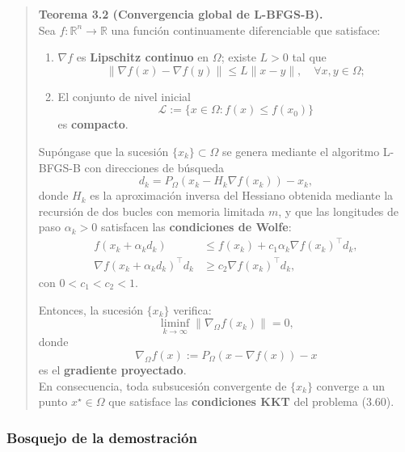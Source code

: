\documentclass[
  spanish,
  us-letterpaper,
  DIV=11,
  numbers=noendperiod]{scrreprt}
\providecommand{\tightlist}{%
  \setlength{\itemsep}{0pt}\setlength{\parskip}{0pt}}
\numberwithin{equation}{section}
\begin{document}
\begin{quote}
\textbf{Teorema 3.2 (Convergencia global de L-BFGS-B).}\\
Sea \(f : \mathbb{R}^n \to \mathbb{R}\) una función continuamente
diferenciable que satisface:

\begin{enumerate}
\def\labelenumi{\arabic{enumi}.}
\tightlist
\item
  \(\nabla f\) es \textbf{Lipschitz continuo} en \(\Omega\); existe
  \(L > 0\) tal que\\
  \[
  \|\nabla f(x) - \nabla f(y)\| \le L \|x - y\|, \quad \forall x, y \in \Omega; \tag{3.61}
  \]
\item
  El conjunto de nivel inicial\\
  \[
  \mathcal{L} := \{x \in \Omega : f(x) \le f(x_0)\} \tag{3.62}
  \] es \textbf{compacto}.
\end{enumerate}

Supóngase que la sucesión \(\{x_k\} \subset \Omega\) se genera mediante
el algoritmo L-BFGS-B con direcciones de búsqueda \[
d_k = P_\Omega(x_k - H_k \nabla f(x_k)) - x_k, \tag{3.63}
\] donde \(H_k\) es la aproximación inversa del Hessiano obtenida
mediante la recursión de dos bucles con memoria limitada \(m\), y que
las longitudes de paso \(\alpha_k > 0\) satisfacen las
\textbf{condiciones de Wolfe}: \[
\begin{aligned}
f(x_k + \alpha_k d_k) &\le f(x_k) + c_1 \alpha_k \nabla f(x_k)^\top d_k, \\
\nabla f(x_k + \alpha_k d_k)^\top d_k &\ge c_2 \nabla f(x_k)^\top d_k,
\end{aligned} \tag{3.64}
\] con \(0 < c_1 < c_2 < 1\).

Entonces, la sucesión \(\{x_k\}\) verifica: \[
\liminf_{k \to \infty} \|\nabla_\Omega f(x_k)\| = 0, \tag{3.65}
\] donde \[
\nabla_\Omega f(x) := P_\Omega(x - \nabla f(x)) - x \tag{3.66}
\] es el \textbf{gradiente proyectado}.\\
En consecuencia, toda subsucesión convergente de \(\{x_k\}\) converge a
un punto \(x^\star \in \Omega\) que satisface las \textbf{condiciones
KKT} del problema (3.60).
\end{quote}

\subsubsection{Bosquejo de la
demostración}\label{bosquejo-de-la-demostraciuxf3n}
\end{document}
